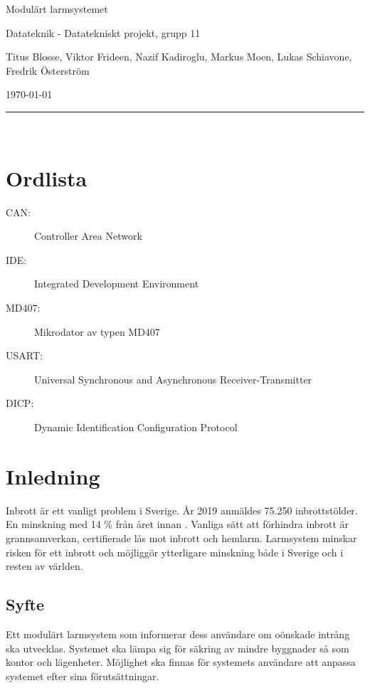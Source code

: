 \documentclass[a4paper]{article}
\begin{document}
\thispagestyle{empty}

\begin{center}
    \parskip=14pt
    \vspace*{3\parskip}

    {\LARGE Modulärt larmsystemet}

    {\large Datateknik - Datatekniskt projekt, grupp 11

    Titus Blosse, Viktor Frideen, Nazif Kadiroglu, Markus Moen, Lukas Schiavone, Fredrik Österström

    \today}

    \rule{7cm}{0.4pt}\\
\end{center}
\newpage

\thispagestyle{empty}

\tableofcontents
\newpage

\thispagestyle{empty}

\section*{Ordlista}

\begin{description}
    \item[CAN:] Controller Area Network
    \item[IDE:] Integrated Development Environment
    \item[MD407:] Mikrodator av typen MD407
    \item[USART:] Universal Synchronous and Asynchronous Receiver-Transmitter
    \item[DICP:] Dynamic Identification Configuration Protocol
\end{description}
\newpage


\section{Inledning}
Inbrott är ett vanligt problem i Sverige.
År 2019 anmäldes 75.250 inbrottstölder.
En minskning med 14 \% från året innan \cite{brastold}.
Vanliga sätt att förhindra inbrott är grannsamverkan, certifierade lås mot inbrott och hemlarm.
Larmsystem minskar risken för ett inbrott och möjliggör ytterligare minskning både i Sverige och i resten av världen.

\subsection{Syfte}
Ett modulärt larmsystem som informerar dess användare om oönskade intrång ska utvecklas.
Systemet ska lämpa sig för säkring av mindre byggnader så som kontor och lägenheter.
Möjlighet ska finnas för systemets användare att anpassa systemet efter sina förutsättningar.
\end{document}
